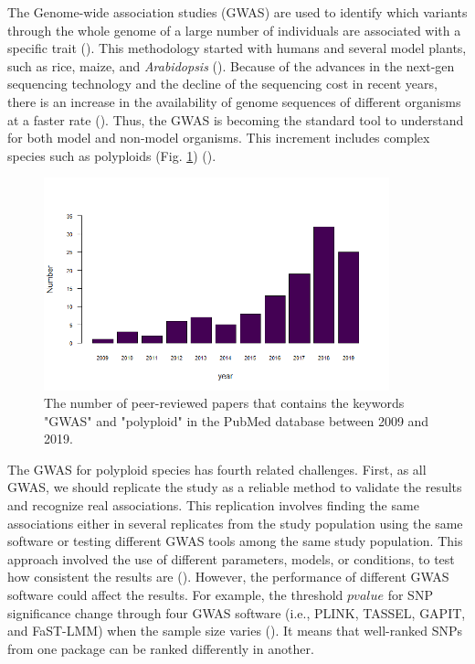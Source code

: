 \documentclass{article}
\begin{document}
The Genome-wide association studies (GWAS) are used to identify which variants through the whole genome of a large number of individuals are associated with a specific trait (\cite{cantor2010prioritizing,begum2012comprehensive}). This methodology started with humans and several model plants, such as rice, maize, and \emph{Arabidopsis} (\cite{lauc2010genomics,tian2011genome,cao2011whole,korte2013advantages,han2013sequencing}). Because of the advances in the next-gen sequencing technology and the decline of the sequencing cost in recent years, there is an increase in the availability of genome sequences of different organisms at a faster rate (\cite{ekblom2011applications,ellegren2014genome}). Thus, the GWAS is becoming the standard tool to understand  for both model and non-model organisms. This increment includes complex species such as polyploids (Fig. \ref{GWASpolyploids}) (\cite{ekblom2011applications,santure2018wild}).


\begin{figure}[H]
\begin{centering}
\includegraphics[width=10cm]{images/GWASpolyploids_Pubmed.png} 
\par\end{centering}
\centering{}\caption{The number of peer-reviewed papers that contains the keywords "GWAS" and "polyploid" in the PubMed database between 2009 and 2019.\label{GWASpolyploids}}
\end{figure}

The GWAS for polyploid species has fourth related challenges. First, as all GWAS, we should replicate the study as a reliable method to validate the results and recognize real associations. This replication involves finding the same associations either in several replicates from the study population using the same software or testing different GWAS tools among the same study population. This approach involved the use of different parameters, models, or conditions, to test how consistent the results are (\cite{De2014, Pearson2008}). However, the performance of different GWAS software could affect the results. For example, the threshold $pvalue$ for SNP significance change through four GWAS software (i.e., PLINK, TASSEL, GAPIT, and FaST-LMM) when the sample size varies (\cite{Yan2019}). It means that well-ranked SNPs from one package can be ranked differently in another.
\end{document}
